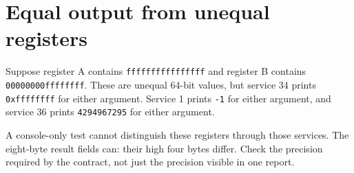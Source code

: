\section{Equal output from unequal
  registers}\label{004-bit-inspector-x-hidden-high-half-equal-output-from-unequal-registers}

Suppose register A contains \texttt{ffffffffffffffff} and register B
contains \texttt{00000000ffffffff}. These are unequal 64-bit values, but
service 34 prints \texttt{0xffffffff} for either argument. Service 1
prints \texttt{-1} for either argument, and service 36 prints
\texttt{4294967295} for either argument.

A console-only test cannot distinguish these registers through those
services. The eight-byte result fields can: their high four bytes
differ. Check the precision required by the contract, not just the
precision visible in one report.
